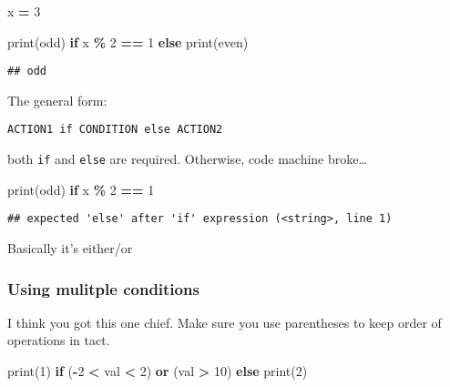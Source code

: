 \documentclass[
]{book}
\newenvironment{Shaded}{\begin{snugshade}}{\end{snugshade}}
\newcommand{\BuiltInTok}[1]{#1}
\newcommand{\ControlFlowTok}[1]{\textcolor[rgb]{0.13,0.29,0.53}{\textbf{#1}}}
\newcommand{\DecValTok}[1]{\textcolor[rgb]{0.00,0.00,0.81}{#1}}
\newcommand{\KeywordTok}[1]{\textcolor[rgb]{0.13,0.29,0.53}{\textbf{#1}}}
\newcommand{\NormalTok}[1]{#1}
\newcommand{\OperatorTok}[1]{\textcolor[rgb]{0.81,0.36,0.00}{\textbf{#1}}}
\newcommand{\StringTok}[1]{\textcolor[rgb]{0.31,0.60,0.02}{#1}}
\begin{document}
\begin{Shaded}
\begin{Highlighting}[]
\NormalTok{x }\OperatorTok{=} \DecValTok{3}

\BuiltInTok{print}\NormalTok{(}\StringTok{\textquotesingle{}odd\textquotesingle{}}\NormalTok{) }\ControlFlowTok{if}\NormalTok{ x }\OperatorTok{\%} \DecValTok{2} \OperatorTok{==} \DecValTok{1} \ControlFlowTok{else} \BuiltInTok{print}\NormalTok{(}\StringTok{\textquotesingle{}even\textquotesingle{}}\NormalTok{)}
\end{Highlighting}
\end{Shaded}

\begin{verbatim}
## odd
\end{verbatim}

The general form:

\texttt{ACTION1\ if\ CONDITION\ else\ ACTION2}

both \texttt{if} and \texttt{else} are required. Otherwise, code machine broke\ldots{}

\begin{Shaded}
\begin{Highlighting}[]
\BuiltInTok{print}\NormalTok{(}\StringTok{\textquotesingle{}odd\textquotesingle{}}\NormalTok{) }\ControlFlowTok{if}\NormalTok{ x }\OperatorTok{\%} \DecValTok{2} \OperatorTok{==} \DecValTok{1}
\end{Highlighting}
\end{Shaded}

\begin{verbatim}
## expected 'else' after 'if' expression (<string>, line 1)
\end{verbatim}

Basically it's either/or

\subsubsection{Using mulitple conditions}\label{using-mulitple-conditions}

I think you got this one chief. Make sure you use parentheses to keep order of operations in tact.

\begin{Shaded}
\begin{Highlighting}[]
\BuiltInTok{print}\NormalTok{(}\DecValTok{1}\NormalTok{) }\ControlFlowTok{if}\NormalTok{ (}\OperatorTok{{-}}\DecValTok{2} \OperatorTok{\textless{}}\NormalTok{ val }\OperatorTok{\textless{}} \DecValTok{2}\NormalTok{) }\KeywordTok{or}\NormalTok{ (val }\OperatorTok{\textgreater{}} \DecValTok{10}\NormalTok{) }\ControlFlowTok{else} \BuiltInTok{print}\NormalTok{(}\DecValTok{2}\NormalTok{)}
\end{Highlighting}
\end{Shaded}
\end{document}

